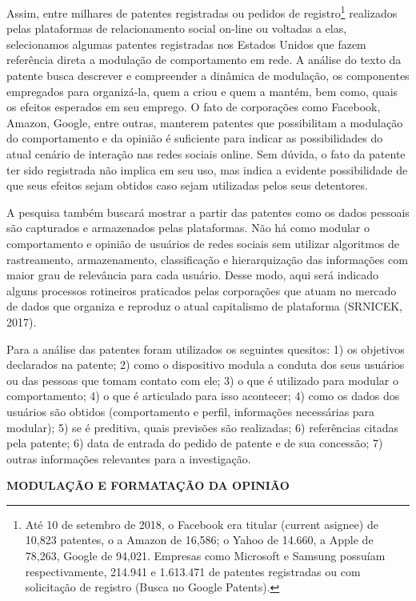 Assim, entre milhares de patentes registradas ou pedidos de
registro\footnote{Até 10 de setembro de 2018, o Facebook era titular
  (current asignee) de 10,823 patentes, o a Amazon de 16,586; o Yahoo de
  14.660, a Apple de 78,263, Google de 94,021. Empresas como Microsoft e
  Samsung possuíam respectivamente, 214.941 e 1.613.471 de patentes
  registradas ou com solicitação de registro (Busca no Google Patents).}
realizados pelas plataformas de relacionamento social on-line ou
voltadas a elas, selecionamos algumas patentes registradas nos Estados
Unidos que fazem referência direta a modulação de comportamento em rede.
A análise do texto da patente busca descrever e compreender a dinâmica
de modulação, os componentes empregados para organizá-la, quem a criou e
quem a mantém, bem como, quais os efeitos esperados em seu emprego. O
fato de corporações como Facebook, Amazon, Google, entre outras,
manterem patentes que possibilitam a modulação do comportamento e da
opinião é suficiente para indicar as possibilidades do atual cenário de
interação nas redes sociais online. Sem dúvida, o fato da patente ter
sido registrada não implica em seu uso, mas indica a evidente
possibilidade de que seus efeitos sejam obtidos caso sejam utilizadas
pelos seus detentores.

A pesquisa também buscará mostrar a partir das patentes como os dados
pessoais são capturados e armazenados pelas plataformas. Não há como
modular o comportamento e opinião de usuários de redes sociais sem
utilizar algoritmos de rastreamento, armazenamento, classificação e
hierarquização das informações com maior grau de relevância para cada
usuário. Desse modo, aqui será indicado alguns processos rotineiros
praticados pelas corporações que atuam no mercado de dados que organiza
e reproduz o atual capitalismo de plataforma (SRNICEK, 2017).

Para a análise das patentes foram utilizados os seguintes quesitos: 1)
os objetivos declarados na patente; 2) como o dispositivo modula a
conduta dos seus usuários ou das pessoas que tomam contato com ele; 3) o
que é utilizado para modular o comportamento; 4) o que é articulado para
isso acontecer; 4) como os dados dos usuários são obtidos (comportamento
e perfil, informações necessárias para modular); 5) se é preditiva,
quais previsões são realizadas; 6) referências citadas pela patente; 6)
data de entrada do pedido de patente e de sua concessão; 7) outras
informações relevantes para a investigação.

\textbf{MODULAÇÃO E FORMATAÇÃO DA OPINIÃO}

